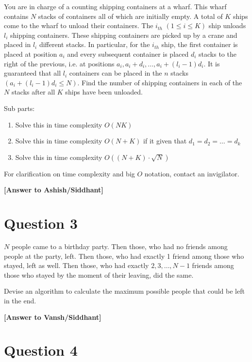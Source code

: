 \documentclass[a4paper,12pt]{article}
\begin{document}
You are in charge of a counting shipping containers at a wharf. This wharf contains $N$ stacks of containers all of which are initially empty. A total of $K$ ships come to the wharf to unload their containers. The $i_{th}$ $(1 \le i \le K)$ ship unloads $l_i$ shipping containers. These shipping containers are picked up by a crane and placed in $l_i$ different stacks. In particular, for the $i_{th}$ ship, the first container is placed at position $a_i$ and every subsequent container is placed $d_i$ stacks to the right of the previous, i.e. at positions $a_i, a_i + d_i, \dots, a_i + (l_i - 1)d_i$. It is guaranteed that all $l_i$ containers can be placed in the $n$ stacks $(a_i + (l_i - 1)d_i \le N)$. Find the number of shipping containers in each of the $N$ stacks after all $K$ ships have been unloaded.

\noindent
Sub parts:
\begin{enumerate}[label=\alph*)]
    \item Solve this in time complexity $O(NK)$
    \item Solve this in time complexity $O(N + K)$ if it given that $d_1 = d_2 = \dots = d_k$
    \item Solve this in time complexity $O((N + K) \cdot \sqrt{N})$
\end{enumerate}
For clarification on time complexity and big $O$ notation, contact an invigilator.

\textbf{[Answer to Ashish/Siddhant]}

\hrulefill

\section*{Question 3}
$N$ people came to a birthday party. Then those, who had no friends among people at the party, left. Then those, who had exactly 1 friend among those who stayed, left as well. Then those, who had exactly $2, 3, \dots, N - 1$ friends among those who stayed by the moment of their leaving, did the same.

Devise an algorithm to calculate the maximum possible people that could be left in the end.

\textbf{[Answer to Vansh/Siddhant]}

\hrulefill

\section*{Question 4}
\end{document}

